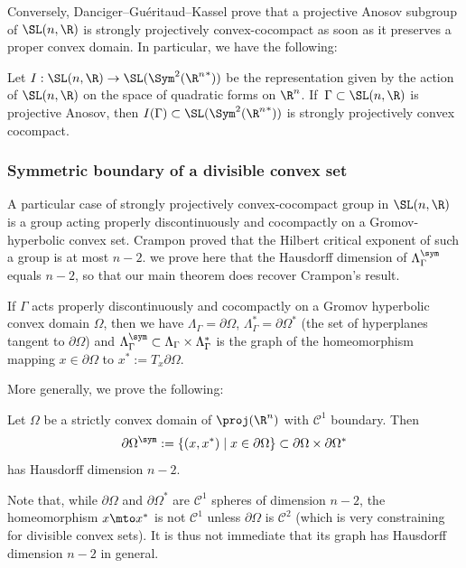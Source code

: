 Conversely, Danciger--Guéritaud--Kassel prove that a projective Anosov subgroup of $\SL(n,\R)$ is strongly projectively convex-cocompact as soon as it preserves a proper convex domain. In particular, we have the following:

\begin{theorem} \label{th - projective anosov are convex cocompact}
Let $I: \SL(n,\R) \to \SL(\Sym^2({\R^n}^*))$ be the representation given by the action of $\SL(n,\R)$ on the space of quadratic forms on $\R^n$. If~$\Gamma \subset \SL(n,\R)$ is projective Anosov, then $I(\Gamma) \subset \SL(\Sym^2({\R^n}^*))$ is strongly projectively convex cocompact.
\end{theorem}

\subsubsection{Symmetric boundary of a divisible convex set}

A particular case of strongly projectively convex-cocompact group in $\SL(n,\R)$ is a group acting properly discontinuously and cocompactly on a Gromov-hyperbolic convex set. Crampon proved that the Hilbert critical exponent of such a group is at most $n-2$. we prove here that the Hausdorff dimension of $\Lambda_\Gamma^{\sym}$ equals $n-2$, so that our main theorem does recover Crampon's result.

If $\Gamma$ acts properly discontinuously and cocompactly on a Gromov hyperbolic convex domain $\Omega$, then we have $\Lambda_\Gamma = \partial \Omega$, $\Lambda_\Gamma^* = \partial \Omega^*$ (the set of hyperplanes tangent to $\partial\Omega$) and $\Lambda^{\sym}_\Gamma \subset \Lambda_\Gamma \times \Lambda_\Gamma^*$ is the graph of the homeomorphism mapping $x\in \partial\Omega$ to $x^* := T_x \partial \Omega$.

More generally, we prove the following:
\begin{theorem} \label{theo - HD Symmetric boundary convex}
Let $\Omega$ be a strictly convex domain of $\proj(\R^n)$ with $\mathcal C^1$ boundary. Then
\[\partial \Omega^{\sym} := \{(x,x^*)\mid x\in \partial \Omega\} \subset \partial \Omega \times \partial \Omega^*\]
has Hausdorff dimension $n-2$.
\end{theorem}

Note that, while $\partial \Omega$ and $\partial\Omega^*$ are $\mathcal C^1$ spheres of dimension $n-2$, the homeomorphism $x\mto x^*$ is not $\mathcal C^1$ unless $\partial \Omega$ is $\mathcal C^2$ (which is very constraining for divisible convex sets). It is thus not immediate that its graph has Hausdorff dimension $n-2$ in general.

